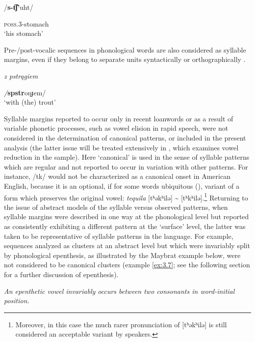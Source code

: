 \ea\label{ex:3.5}

/\textbf{s-t͡ʃ’}uht/

\textsc{poss.3}-stomach\\
\glt ‘his stomach’
\citep[24]{Polian2006}
\z

Pre-/post-vocalic sequences in phonological words are also considered as syllable margins, even if they belong to separate units syntactically or orthographically .

\ea\label{ex:3.6}

\textit{z pstrągiem}

\textit{/}\textbf{spstr}oŋɟem/\\
\glt ‘with (the) trout’
\citep[103]{Jassem2003}
\z

  Syllable margins reported to occur only in recent loanwords or as a result of variable phonetic processes, such as vowel elision in rapid speech, were not considered in the determination of canonical patterns, or included in the present analysis (the latter issue will be treated extensively in , which examines vowel reduction in the sample). Here ‘canonical’ is used in the sense of syllable patterns which are regular and not reported to occur in variation with other patterns. For instance, /tk/ would not be characterized as a canonical onset in American English, because it is an optional, if for some words ubiquitous (\citealt{NapoleãodeSouza2019}), variant of a form which preserves the original vowel: \textit{tequila} [tʰəkʰilə] {\textasciitilde} [tʰkʰilə].\footnote{{Moreover, in this case the much rarer pronunciation of [tʰəkʰilə] is still considered an acceptable variant by speakers.}} Returning to the issue of abstract models of the syllable versus observed patterns, when syllable margins were described in one way at the phonological level but reported as consistently exhibiting a different pattern at the ‘surface’ level, the latter was taken to be representative of syllable patterns in the language. For example, sequences analyzed as clusters at an abstract level but which were invariably split by phonological epenthesis, as illustrated by the Maybrat example below, were not considered to be canonical clusters (example \ref{ex:3.7}; see the following section for a further discussion of epenthesis).

\ea\label{ex:3.7}

\textit{An epenthetic vowel invariably occurs between two consonants in word-initial position.}

